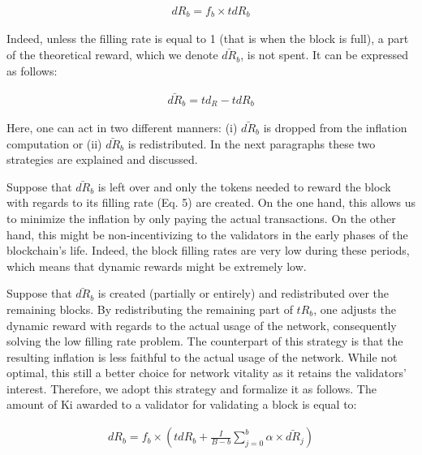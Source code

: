 \documentclass[conference]{IEEEtran}
\begin{document}
\begin{ceqn}
	\begin{align}
		dR_b=f_b \times tdR_b
	\end{align}
\end{ceqn}

Indeed, unless the filling rate is equal to 1 (that is when the block is full), a part of the theoretical reward, which we denote $\bar{dR}_b$, is not spent. It can be expressed as follows: 
\begin{ceqn}
	\begin{align}
		\bar{dR}_b=td_R - tdR_b
	\end{align}
\end{ceqn} 

Here, one can act in two different manners: (i) $\bar{dR}_b$ is dropped from the inflation computation or (ii) $\bar{dR}_b$ is redistributed. In the next paragraphs these two strategies are explained and discussed.

Suppose that $\bar{dR}_b$ is left over and only the tokens needed to reward the block with regards to its filling rate (Eq. 5) are created. On the one hand, this allows us to minimize the inflation by only paying the actual transactions. On the other hand, this might be non-incentivizing to the validators in the early phases of the blockchain's life. Indeed, the block filling rates are very low during these periods, which means that dynamic rewards might be extremely low.

Suppose that $\bar{dR}_b$ is created (partially or entirely) and redistributed over the remaining blocks. By redistributing the remaining part of $tR_b$, one adjusts the dynamic reward with regards to the actual usage of the network, consequently solving the low filling rate problem. The counterpart of this strategy is that the resulting inflation is less faithful to the actual usage of the network. While not optimal, this still a better choice for network vitality as it retains the validators' interest. Therefore, we adopt this strategy and formalize it as follows. The amount of Ki awarded to a validator for validating a block is equal to: 

\begin{ceqn}
	\begin{align}
		dR_b=f_b  \times ( tdR_b + \frac{I}{B-b} \sum_{j=0}^{b} \alpha \times \bar{dR}_j)
	\end{align}
\end{ceqn}
					
\end{document}
